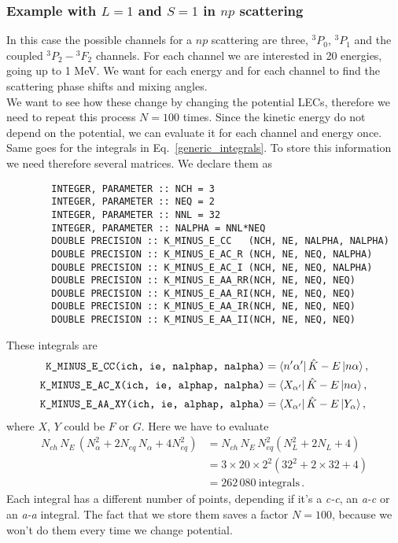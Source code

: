 \documentclass[10pt,a4paper]{article}
\DeclarePairedDelimiter\Bra{\langle}{\rvert}
\DeclarePairedDelimiter\Ket{\lvert}{\rangle}
\newcommand{\bra}[1]{\Bra{#1}}
\newcommand{\ket}[1]{\Ket{#1}}
\newcommand{\matrixelement}[3]{\bra{#1}\,#2\,\ket{#3}}
\newcommand{\eq}[1]{Eq.~#1}
\newcommand{\mtm}[1]{\mathrm{#1}}
\begin{document}
	 \subsubsection{Example with $L=1$ and $S=1$ in $np$ scattering}
	 In this case the possible channels for a $np$ scattering are three, $^3P_0$, $^3P_1$ and the coupled $^3P_2-{^3}F_2$ channels. For each channel we are interested in 20 energies, going up to 1 MeV. We want for each energy and for each channel to find the scattering phase shifts and mixing angles. \\
	 We want to see how these change by changing the potential LECs, therefore we need to repeat this process $N=100$ times. Since the kinetic energy do not depend on the potential, we can evaluate it for each channel and energy once. 
	 Same goes for the integrals in \eq{\eqref{generic_integrals}}.
	 To store this information we need therefore several matrices. We declare them as 
	 \begin{verbatim}
	 	INTEGER, PARAMETER :: NCH = 3
	 	INTEGER, PARAMETER :: NEQ = 2
	 	INTEGER, PARAMETER :: NNL = 32
	 	INTEGER, PARAMETER :: NALPHA = NNL*NEQ
	 	DOUBLE PRECISION :: K_MINUS_E_CC   (NCH, NE, NALPHA, NALPHA)
	 	DOUBLE PRECISION :: K_MINUS_E_AC_R (NCH, NE, NEQ, NALPHA)
	 	DOUBLE PRECISION :: K_MINUS_E_AC_I (NCH, NE, NEQ, NALPHA)
	 	DOUBLE PRECISION :: K_MINUS_E_AA_RR(NCH, NE, NEQ, NEQ)
	 	DOUBLE PRECISION :: K_MINUS_E_AA_RI(NCH, NE, NEQ, NEQ)
	 	DOUBLE PRECISION :: K_MINUS_E_AA_IR(NCH, NE, NEQ, NEQ)
	 	DOUBLE PRECISION :: K_MINUS_E_AA_II(NCH, NE, NEQ, NEQ)
	 \end{verbatim}
	 These integrals are
	 \begin{align}
	 	\texttt{K\_MINUS\_E\_CC(ich, ie, nalphap, nalpha)} &= \matrixelement{n'\alpha'}{\hat{K}-E}{n\alpha}\,,\\
	 	\texttt{K\_MINUS\_E\_AC\_X(ich, ie, alphap, nalpha)} &= \matrixelement{X_{\alpha'}}{\hat{K}-E}{n\alpha}\,,\\
	 	\texttt{K\_MINUS\_E\_AA\_XY(ich, ie, alphap, alpha)} &= \matrixelement{X_{\alpha'}}{\hat{K}-E}{Y_\alpha}\,,
	 \end{align}
	 where $X,\,Y$ could be $F$ or $G$.
	 Here we have to evaluate
	 \begin{align}
	 	N_{ch} \,N_{E}\,\left(
	 	N_\alpha^2 +2 N_{eq}\,N_\alpha + 4 N_{eq}^2
	 	\right)
	 	&=
	 	N_{ch} \,N_{E}\,N_{eq}^2\left(
	 	N_L^2 +2 N_L + 4
	 	\right)\\
	 	&=
	 	3\times 20\times 2^2(32^2+2\times 32 +4)\\
	 	&= 262\,080~\mtm{integrals}\,.
	 \end{align}
	 Each integral has a different number of points, depending 
	 if it's a \textit{c-c}, an \textit{a-c} or an \textit{a-a }integral. The fact that we store them saves a factor $N=100$, because we won't do them every time we change potential.
	 
\end{document}
